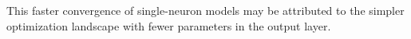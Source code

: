 \documentclass[11pt]{article}
\begin{document}
This faster convergence of single-neuron models may be attributed to the simpler optimization landscape with fewer parameters in the output layer.










\end{document}
